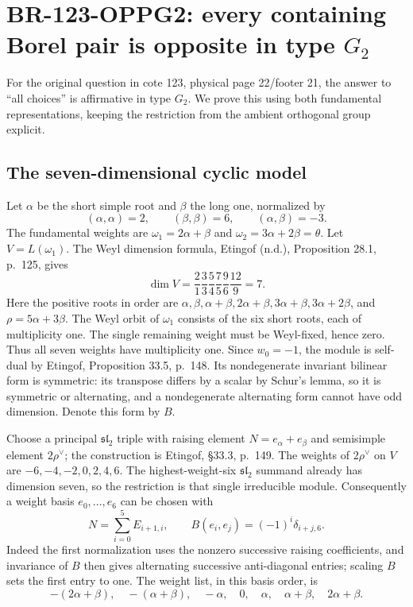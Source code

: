 \section{BR-123-OPPG2: every containing Borel pair is opposite in type \texorpdfstring{$G_2$}{G2}}

For the original question in cote 123, physical page 22/footer 21,
the answer to ``all choices'' is affirmative in type $G_2$.
We prove this using both fundamental representations, keeping the
restriction from the ambient orthogonal group explicit.

\subsection{The seven-dimensional cyclic model}
Let $\alpha$ be the short simple root and $\beta$ the long one,
normalized by
\[
 (\alpha,\alpha)=2,\qquad(\beta,\beta)=6,
                  \qquad(\alpha,\beta)=-3.
\]
The fundamental weights are $\omega_1=2\alpha+\beta$ and
$\omega_2=3\alpha+2\beta=\theta$.  Let $V=L(\omega_1)$.
The Weyl dimension formula, Etingof (n.d.), Proposition 28.1,
p.~125, gives
\[
 \dim V=\frac21\frac33\frac54\frac75\frac96\frac{12}9=7.
 \tag{G2.1}
\]
Here the positive roots in order are
$\alpha,\beta,\alpha+\beta,2\alpha+\beta,3\alpha+\beta,
3\alpha+2\beta$, and $\rho=5\alpha+3\beta$.
The Weyl orbit of $\omega_1$ consists of the six short roots,
each of multiplicity one.  The single remaining weight must be
Weyl-fixed, hence zero.  Thus all seven weights have multiplicity
one.  Since $w_0=-1$, the module is self-dual by Etingof,
Proposition 33.5, p.~148.  Its nondegenerate invariant bilinear
form is symmetric: its transpose differs by a scalar by Schur's
lemma, so it is symmetric or alternating, and a nondegenerate
alternating form cannot have odd dimension.  Denote this form by $B$.

Choose a principal $\mathfrak{sl}_2$ triple with raising element
$N=e_\alpha+e_\beta$ and semisimple element $2\rho^\vee$;
the construction is Etingof, \S33.3, p.~149.  The weights of
$2\rho^\vee$ on $V$ are $-6,-4,-2,0,2,4,6$.
The highest-weight-six $\mathfrak{sl}_2$ summand already has
dimension seven, so the restriction is that single irreducible
module.  Consequently a weight basis $e_0,\ldots,e_6$ can be
chosen with
\[
 N=\sum_{i=0}^{5}E_{i+1,i},\qquad
 B(e_i,e_j)=(-1)^i\delta_{i+j,6}.
 \tag{G2.2}
\]
Indeed the first normalization uses the nonzero successive raising
coefficients, and invariance of $B$ then gives alternating successive
anti-diagonal entries; scaling $B$ sets the first entry to one.
The weight list, in this basis order, is
\[
 -(2\alpha+\beta),\quad-(\alpha+\beta),\quad-\alpha,
 \quad0,\quad\alpha,\quad\alpha+\beta,\quad2\alpha+\beta.
 \tag{G2.3}
\]

